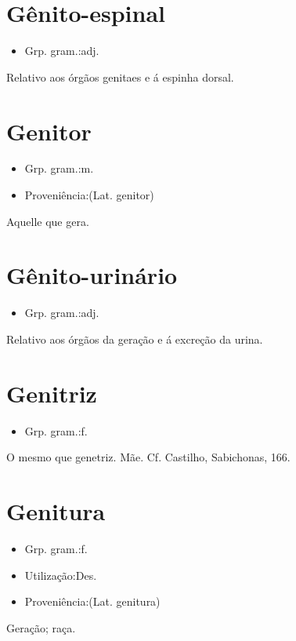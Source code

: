 \section{Gênito-espinal}
\begin{itemize}
\item {Grp. gram.:adj.}
\end{itemize}
Relativo aos órgãos genitaes e á espinha dorsal.
\section{Genitor}
\begin{itemize}
\item {Grp. gram.:m.}
\end{itemize}
\begin{itemize}
\item {Proveniência:(Lat. \textunderscore genitor\textunderscore )}
\end{itemize}
Aquelle que gera.
\section{Gênito-urinário}
\begin{itemize}
\item {Grp. gram.:adj.}
\end{itemize}
Relativo aos órgãos da geração e á excreção da urina.
\section{Genitriz}
\begin{itemize}
\item {Grp. gram.:f.}
\end{itemize}
O mesmo que \textunderscore genetriz\textunderscore .
Mãe. Cf. Castilho, \textunderscore Sabichonas\textunderscore , 166.
\section{Genitura}
\begin{itemize}
\item {Grp. gram.:f.}
\end{itemize}
\begin{itemize}
\item {Utilização:Des.}
\end{itemize}
\begin{itemize}
\item {Proveniência:(Lat. \textunderscore genitura\textunderscore )}
\end{itemize}
Geração; raça.
